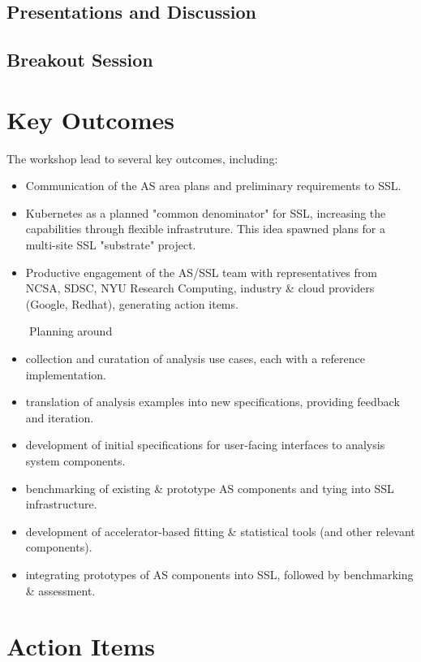 \documentclass[11pt,letterpaper,fleqn]{article}
\begin{document}
\subsection{Presentations and Discussion}
\blindtext[2]

\subsection{Breakout Session}
\blindtext[2]

\section{Key Outcomes}
The workshop lead to several key outcomes, including:

\begin{itemize}
  \item Communication of the AS area plans and preliminary requirements to SSL.
  \item Kubernetes as a planned "common denominator" for SSL, increasing the capabilities through flexible infrastruture. This idea spawned plans for a multi-site SSL "substrate" project.
  \item Productive engagement of the AS/SSL team with representatives from NCSA, SDSC, NYU Research Computing, industry \& cloud providers (Google, Redhat), generating action items.
\end{itemize}
\vspace{-5pt}
~~~~Planning around
\vspace{-5pt}
\begin{itemize}
  \item collection and curatation of analysis use cases, each with a reference implementation.
  \item translation of analysis examples into new specifications, providing feedback and iteration.
  \item development of initial specifications for user-facing interfaces to analysis system components.
  \item benchmarking of existing \& prototype AS components and tying into SSL infrastructure.
  \item development of accelerator-based fitting \& statistical tools (and other relevant components).
  \item integrating prototypes of AS components into SSL, followed by benchmarking \& assessment.
\end{itemize}

\section{Action Items}
\blindtext[2]
\end{document}
